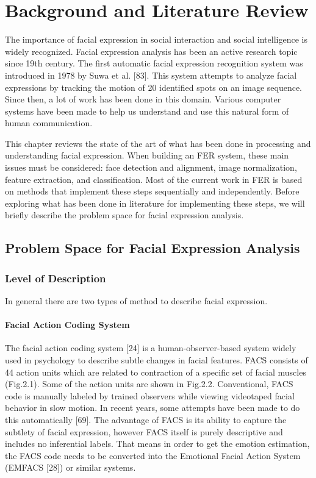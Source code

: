 \documentclass[12pt, twoside]{report}
\begin{document}
	\tableofcontents
	
	\newpage
	
 
	\chapter{Background and Literature Review}
	\large{The importance of facial expression in social interaction and social intelligence is widely recognized. Facial expression analysis has been an active research topic since 19th century. The first automatic facial expression recognition system was introduced in 1978 by Suwa et al. [83]. This system attempts to analyze facial expressions by tracking the motion of 20 identified spots on an image sequence. Since then, a lot of work has been done in this domain. Various computer systems have been made to help us understand and use this natural form of human communication.}\par
	\large{This chapter reviews the state of the art of what has been done in processing and understanding facial expression. When building an FER system, these main issues must be considered: face detection and alignment, image normalization, feature extraction, and classification. Most of the current work in FER is based on methods that implement these steps sequentially and independently. Before exploring what has been done in literature for implementing these steps, we will briefly describe the problem space for facial expression analysis.}

	\section{Problem Space for Facial Expression Analysis}
	\subsection{Level of Description}
	\large{In general there are two types of method to describe facial expression.}
	
	\newpage
	
	\subsubsection{Facial Action Coding System}
	\par 
	\large{The facial action coding system [24] is a human-observer-based system widely used in psychology to describe subtle changes in facial features. FACS consists of 44 action units which are related to contraction of a specific set of facial muscles (Fig.2.1). Some of the action units are shown in Fig.2.2. Conventional, FACS code is manually labeled by trained observers while viewing videotaped facial behavior in slow motion. In recent years, some attempts have been made to do this automatically [69]. The advantage of FACS is its ability to capture the subtlety of facial expression, however FACS itself is purely descriptive and includes no inferential labels. That means in order to get the emotion estimation, the FACS code needs to be converted into the Emotional Facial Action System (EMFACS [28]) or similar systems.}\\
\end{document}
